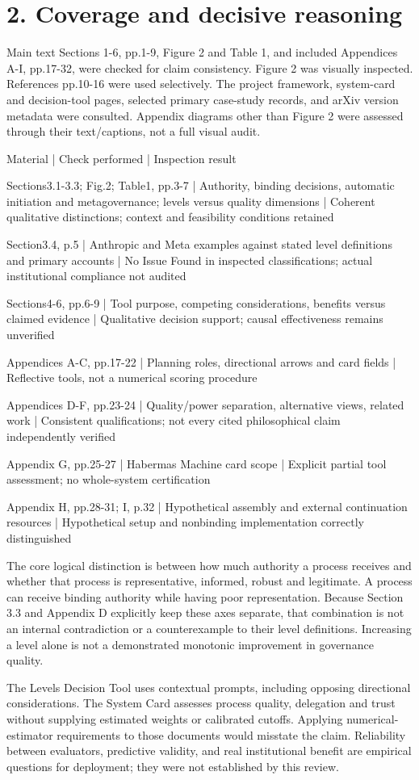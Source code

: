 \documentclass[10pt]{article}
\begin{document}
\section*{2. Coverage and decisive reasoning}
Main text Sections 1-6, pp.1-9, Figure 2 and Table 1, and included Appendices A-I, pp.17-32, were checked for claim consistency. Figure 2 was visually inspected. References pp.10-16 were used selectively. The project framework, system-card and decision-tool pages, selected primary case-study records, and arXiv version metadata were consulted. Appendix diagrams other than Figure 2 were assessed through their text/captions, not a full visual audit.\par
Material | Check performed | Inspection result\par
Sections3.1-3.3; Fig.2; Table1, pp.3-7 | Authority, binding decisions, automatic initiation and metagovernance; levels versus quality dimensions | Coherent qualitative distinctions; context and feasibility conditions retained\par
Section3.4, p.5 | Anthropic and Meta examples against stated level definitions and primary accounts | No Issue Found in inspected classifications; actual institutional compliance not audited\par
Sections4-6, pp.6-9 | Tool purpose, competing considerations, benefits versus claimed evidence | Qualitative decision support; causal effectiveness remains unverified\par
Appendices A-C, pp.17-22 | Planning roles, directional arrows and card fields | Reflective tools, not a numerical scoring procedure\par
Appendices D-F, pp.23-24 | Quality/power separation, alternative views, related work | Consistent qualifications; not every cited philosophical claim independently verified\par
Appendix G, pp.25-27 | Habermas Machine card scope | Explicit partial tool assessment; no whole-system certification\par
Appendix H, pp.28-31; I, p.32 | Hypothetical assembly and external continuation resources | Hypothetical setup and nonbinding implementation correctly distinguished\par
The core logical distinction is between how much authority a process receives and whether that process is representative, informed, robust and legitimate. A process can receive binding authority while having poor representation. Because Section 3.3 and Appendix D explicitly keep these axes separate, that combination is not an internal contradiction or a counterexample to their level definitions. Increasing a level alone is not a demonstrated monotonic improvement in governance quality.\par
The Levels Decision Tool uses contextual prompts, including opposing directional considerations. The System Card assesses process quality, delegation and trust without supplying estimated weights or calibrated cutoffs. Applying numerical-estimator requirements to those documents would misstate the claim. Reliability between evaluators, predictive validity, and real institutional benefit are empirical questions for deployment; they were not established by this review.\par
\end{document}
